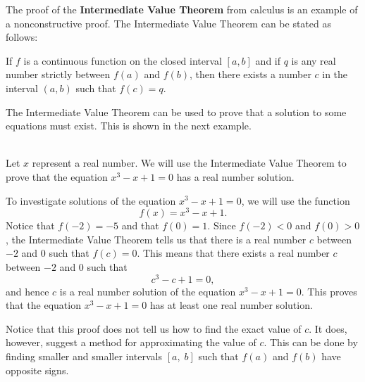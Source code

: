 The proof of the \textbf{Intermediate Value Theorem}
%
 from calculus is an example of a nonconstructive proof.  The Intermediate Value Theorem can be stated as follows:
\begin{list}{}
\item If  $f$  is a continuous function on the closed interval  $\left[ {a,b} \right]$ and if  $q$  is any real number strictly between  $f( a )$  and  $f( b )$, then there exists a number  $c$  in the interval  $\left( {a,b} \right)$ such that  $f( c ) = q$.
\end{list}
\vskip10pt
%
The Intermediate Value Theorem can be used to prove that a solution to some equations must exist.  This is shown in the next example.
%
\begin{example} \hfill \\
Let  $x$  represent a real number.  We will use the Intermediate Value Theorem to prove that the equation  $x^3  - x + 1 = 0$ has a real number solution.

To investigate solutions of the equation  $x^3  - x + 1 = 0$, we will use the function
\[
f( x ) = x^3  - x + 1.
\]
Notice that  $f( { - 2} ) =  - 5$  and that  $f( 0 ) = 1$.  Since 
$f ( -2 ) < 0$ and $f ( 0 ) > 0$, the Intermediate Value Theorem tells us that there is a real number  $c$  between  $-2$ and  $0$  such that  $f( c ) = 0$.  This means that there exists a real number $c$ between $-2$ and $0$ such that
\[
c^3  - c + 1 = 0,
\]
and hence  $c$  is a real number solution of the equation  $x^3  - x + 1 = 0$.  This proves that the equation  $x^3  - x + 1 = 0$  has at least one real number solution.


Notice that this proof does not tell us how to find the exact value of  $c$.  It does, however, suggest a method for approximating the value of  $c$.  This can be done by finding smaller and smaller intervals  $\left[ {a,\;b} \right]$  such that  
$f( a )$  and  $f( b )$  have opposite signs.
\end{example}
\hbreak


\endinput
